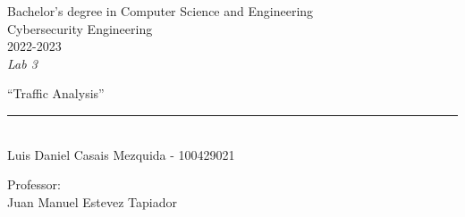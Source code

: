 \begin{titlepage}
    \begin{sffamily}
    \color{azulUC3M}
    \begin{center}
        \begin{figure}[H]
        \end{figure}
        \vspace{1.5cm}
        \begin{Large}
            Bachelor's degree in Computer Science and Engineering\\
            Cybersecurity Engineering\\
            2022-2023\\
            \vspace{2cm}
            \textsl{Lab 3}
            \bigskip

        \end{Large}
            {\Huge ``Traffic Analysis''}\\
            \vspace*{0.5cm}
            \rule{10.5cm}{0.1mm}\\
            \vspace*{0.9cm}
            {\LARGE Luis Daniel Casais Mezquida - 100429021}\\
            \vspace*{0.2cm}

            \vspace*{0.8cm}
        \begin{Large}
            Professor:\\
            Juan Manuel Estevez Tapiador\\
        \end{Large}
    \end{center}
    \vfill

    \end{sffamily}
\end{titlepage}
